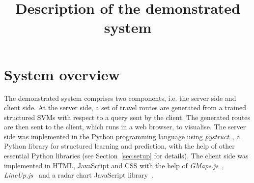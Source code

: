 \documentclass[sigconf]{acmart}
\begin{document}
\title{Description of the demonstrated system}
\maketitle

\thispagestyle{empty}

\section{System overview}
\label{sec:overview}
The demonstrated system comprises two components, i.e. the server side and client side.
At the server side, a set of travel routes are generated from a trained structured SVMs with respect to
a query sent by the client. 
The generated routes are then sent to the client, which runs in a web browser, to visualise.
The server side was implemented in the Python programming language using \textit{pystruct}~\cite{JMLR:v15:mueller14a},
a Python library for structured learning and prediction,
with the help of other essential Python libraries (see Section~\ref{sec:setup} for details).
The client side was implemented in HTML, JavaScript and CSS with the help of \textit{GMaps.js}~\cite{gmaps.js}, \textit{LineUp.js}~\cite{lineup.js} and a radar chart JavaScript library~\cite{radarchart.js}.


\end{document}
